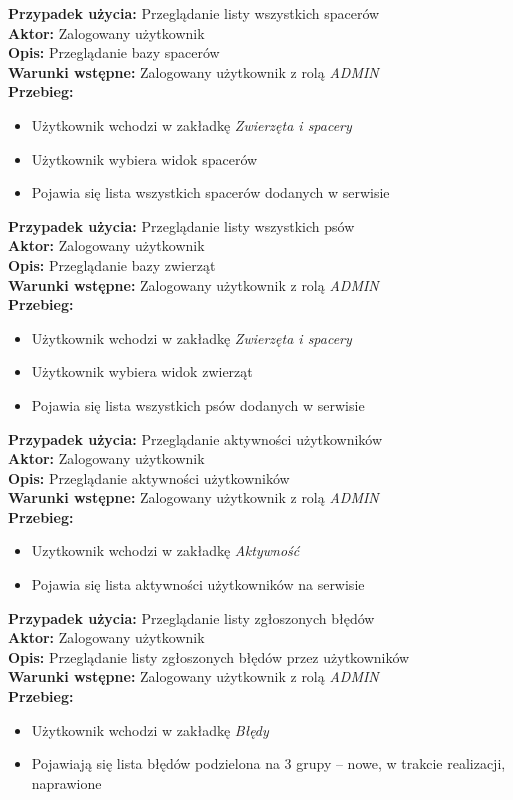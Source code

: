 \noindent
\textbf{Przypadek użycia:} Przeglądanie listy wszystkich spacerów\\
\textbf{Aktor:} Zalogowany użytkownik\\
\textbf{Opis:} Przeglądanie bazy spacerów\\
\textbf{Warunki wstępne:} Zalogowany użytkownik z rolą \textit{ADMIN}\\
\textbf{Przebieg:}
\begin{itemize}
    \item Użytkownik wchodzi w zakładkę \textit{Zwierzęta i spacery}
    \item Użytkownik wybiera widok spacerów
    \item Pojawia się lista wszystkich spacerów dodanych w serwisie 
\end{itemize}

\noindent
\textbf{Przypadek użycia:} Przeglądanie listy wszystkich psów \\
\textbf{Aktor:} Zalogowany użytkownik\\
\textbf{Opis:} Przeglądanie bazy zwierząt\\
\textbf{Warunki wstępne:} Zalogowany użytkownik z rolą \textit{ADMIN}\\
\textbf{Przebieg:}
\begin{itemize}
    \item Użytkownik wchodzi w zakładkę \textit{Zwierzęta i spacery}
    \item Użytkownik wybiera widok zwierząt
    \item Pojawia się lista wszystkich psów dodanych w serwisie 
\end{itemize}

\noindent
\textbf{Przypadek użycia:} Przeglądanie aktywności użytkowników\\
\textbf{Aktor:} Zalogowany użytkownik\\
\textbf{Opis:} Przeglądanie aktywności użytkowników\\
\textbf{Warunki wstępne:} Zalogowany użytkownik z rolą \textit{ADMIN} \\
\textbf{Przebieg:}
\begin{itemize}
    \item Uzytkownik wchodzi w zakładkę \textit{Aktywność}
    \item Pojawia się lista aktywności użytkowników na serwisie
\end{itemize}

\noindent
\textbf{Przypadek użycia:} Przeglądanie listy zgłoszonych błędów\\
\textbf{Aktor:} Zalogowany użytkownik\\
\textbf{Opis:} Przeglądanie listy zgłoszonych błędów przez użytkowników\\
\textbf{Warunki wstępne:} Zalogowany użytkownik z rolą \textit{ADMIN}\\
\textbf{Przebieg:}
\begin{itemize}
    \item Użytkownik wchodzi w zakładkę \textit{Błędy}
    \item Pojawiają się lista błędów podzielona na 3 grupy -- nowe, w trakcie realizacji, naprawione
\end{itemize}

